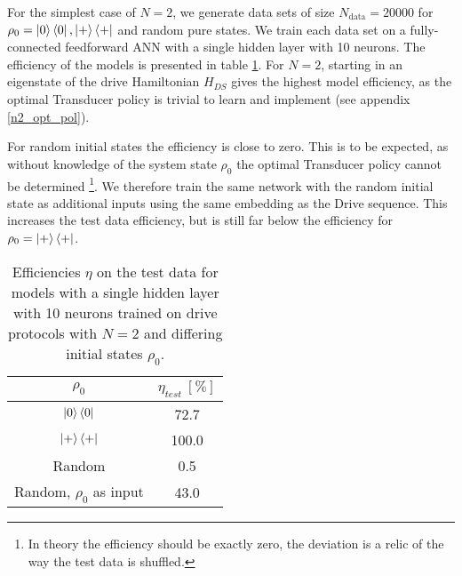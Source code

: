 For the simplest case of $N = 2$, we generate data sets of size $N_{\mathrm{data}} = 20000$ for $\rho_0 = \ket{0} \bra{0}, \ket{+} \bra{+}$ and random pure states.
We train each data set on a fully-connected feedforward ANN with a single hidden layer with 10 neurons.
The efficiency of the models is presented in table \ref{n2efftable}.
For $N = 2$, starting in an eigenstate of the drive Hamiltonian $H_{DS}$ gives the highest model efficiency, as the optimal Transducer policy is trivial to learn and implement (see appendix \ref{n2_opt_pol}).

For random initial states the efficiency is close to zero.
This is to be expected, as without knowledge of the system state $\rho_0$ the optimal Transducer policy cannot be determined \footnote{In theory the efficiency should be exactly zero, the deviation is a relic of the way the test data is shuffled.}.
We therefore train the same network with the random initial state as additional inputs using the same embedding as the Drive sequence.
This increases the test data efficiency, but is still far below the efficiency for $\rho_0 = \ket{+} \bra{+}$.


\begin{table}[h]
	\centering
	\begin{tabular}{ c | c }
		$\rho_0$ & $\eta_{test} \ [\%]$ \\
		\hline
		$\ket{0} \bra{0}$ & 72.7 \\
		$\ket{+} \bra{+}$ & 100.0 \\
		Random & 0.5 \\
		Random, $\rho_0$ as input & 43.0 \\
	\end{tabular}
	\caption{Efficiencies $\eta$ on the test data for models with a single hidden layer with 10 neurons trained on drive protocols with $N = 2$ and differing initial states $\rho_0$.}
	\label{n2efftable}
\end{table}